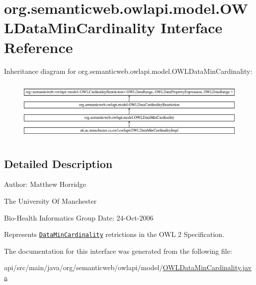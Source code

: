 \hypertarget{interfaceorg_1_1semanticweb_1_1owlapi_1_1model_1_1_o_w_l_data_min_cardinality}{\section{org.\-semanticweb.\-owlapi.\-model.\-O\-W\-L\-Data\-Min\-Cardinality Interface Reference}
\label{interfaceorg_1_1semanticweb_1_1owlapi_1_1model_1_1_o_w_l_data_min_cardinality}
}
Inheritance diagram for org.\-semanticweb.\-owlapi.\-model.\-O\-W\-L\-Data\-Min\-Cardinality\-:\begin{figure}[H]
\begin{center}
\leavevmode
\includegraphics[height=3.031123cm]{interfaceorg_1_1semanticweb_1_1owlapi_1_1model_1_1_o_w_l_data_min_cardinality}
\end{center}
\end{figure}


\subsection{Detailed Description}
Author\-: Matthew Horridge\par
 The University Of Manchester\par
 Bio-\/\-Health Informatics Group Date\-: 24-\/\-Oct-\/2006 

Represents \href{http://www.w3.org/TR/2009/REC-owl2-syntax-20091027/#Minimum_Cardinality_2}{\tt Data\-Min\-Cardinality} retrictions in the O\-W\-L 2 Specification. 

The documentation for this interface was generated from the following file\-:\begin{DoxyCompactItemize}
\item 
api/src/main/java/org/semanticweb/owlapi/model/\hyperlink{_o_w_l_data_min_cardinality_8java}{O\-W\-L\-Data\-Min\-Cardinality.\-java}\end{DoxyCompactItemize}
